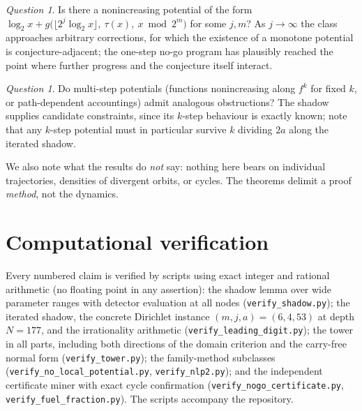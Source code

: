 \documentclass[11pt]{article}
\theoremstyle{definition}
\theoremstyle{remark}
\newtheorem{question}[theorem]{Question}
\begin{document}
\begin{question}
Is there a nonincreasing potential of the form
$\log_2x+g\bigl(\lfloor2^{j}\log_2x\rfloor,\ \tau(x),\
x\bmod2^m\bigr)$ for some $j,m$? As $j\to\infty$ the class approaches
arbitrary corrections, for which the existence of a monotone potential
is conjecture-adjacent; the one-step no-go program has plausibly
reached the point where further progress and the conjecture itself
interact.
\end{question}

\begin{question}
Do multi-step potentials (functions nonincreasing along $f^{k}$ for
fixed $k$, or path-dependent accountings) admit analogous obstructions?
The shadow supplies candidate constraints, since its $k$-step behaviour
is exactly known; note that any $k$-step potential must in particular
survive $k$ dividing $2a$ along the iterated shadow.
\end{question}

We also note what the results do \emph{not} say: nothing here bears on
individual trajectories, densities of divergent orbits, or cycles. The
theorems delimit a proof \emph{method}, not the dynamics.

\section{Computational verification}\label{sec:verification}

Every numbered claim is verified by scripts using exact integer and
rational arithmetic (no floating point in any assertion): the shadow
lemma over wide parameter ranges with detector evaluation at all nodes
(\texttt{verify\_shadow.py}); the iterated shadow, the concrete
Dirichlet instance $(m,j,a)=(6,4,53)$ at depth $N=177$, and the
irrationality arithmetic (\texttt{verify\_leading\_digit.py}); the
tower in all parts, including both directions of the domain criterion
and the carry-free normal form
(\texttt{verify\_tower.py}); the family-method subclasses
(\texttt{verify\_no\_local\_potential.py}, \texttt{verify\_nlp2.py});
and the independent certificate miner with exact cycle confirmation
(\texttt{verify\_nogo\_certificate.py},
\texttt{verify\_fuel\_fraction.py}). The scripts accompany the
repository.
\end{document}

